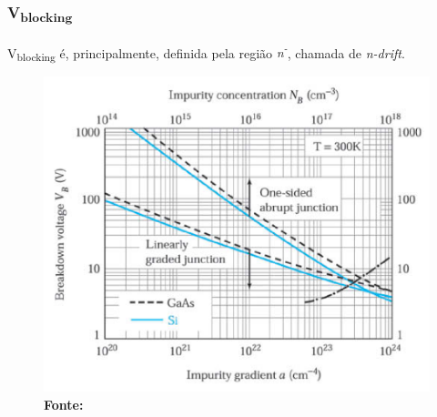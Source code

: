 \begin{frame}

    \frametitle{V\textsubscript{blocking}}

    V\textsubscript{blocking} é, principalmente, definida pela região \textit{n\textsuperscript{-}}, chamada de \textit{n-drift}.

    \begin{figure}[!htbp]
        \centering
        \includegraphics[scale=0.2]{imagens/vblockndrift.png}
        \\\small{\textbf{Fonte:} \cite{sze2012semiconductor}}%
    \end{figure}

\end{frame}

